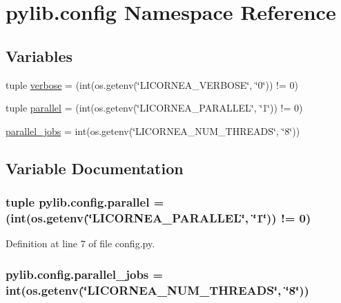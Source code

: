 \hypertarget{namespacepylib_1_1config}{}\section{pylib.\+config Namespace Reference}
\label{namespacepylib_1_1config}
\subsection*{Variables}
\begin{DoxyCompactItemize}
\item 
tuple \hyperlink{namespacepylib_1_1config_a438cd472f53260ba54c02463f1d387ea}{verbose} = (int(os.\+getenv(\char`\"{}L\+I\+C\+O\+R\+N\+E\+A\+\_\+\+V\+E\+R\+B\+O\+SE\char`\"{}, \char`\"{}0\char`\"{})) != 0)
\item 
tuple \hyperlink{namespacepylib_1_1config_a9f699a65a2b9174996c25d6d38c7baa4}{parallel} = (int(os.\+getenv(\char`\"{}L\+I\+C\+O\+R\+N\+E\+A\+\_\+\+P\+A\+R\+A\+L\+L\+EL\char`\"{}, \char`\"{}1\char`\"{})) != 0)
\item 
\hyperlink{namespacepylib_1_1config_a090a7303c411105af2edd4bccfff1af5}{parallel\+\_\+jobs} = int(os.\+getenv(\char`\"{}L\+I\+C\+O\+R\+N\+E\+A\+\_\+\+N\+U\+M\+\_\+\+T\+H\+R\+E\+A\+DS\char`\"{}, \char`\"{}8\char`\"{}))
\end{DoxyCompactItemize}


\subsection{Variable Documentation}
\subsubsection[{\texorpdfstring{parallel}{parallel}}]{\setlength{\rightskip}{0pt plus 5cm}tuple pylib.\+config.\+parallel = (int(os.\+getenv(\char`\"{}L\+I\+C\+O\+R\+N\+E\+A\+\_\+\+P\+A\+R\+A\+L\+L\+EL\char`\"{}, \char`\"{}1\char`\"{})) != 0)}\hypertarget{namespacepylib_1_1config_a9f699a65a2b9174996c25d6d38c7baa4}{}\label{namespacepylib_1_1config_a9f699a65a2b9174996c25d6d38c7baa4}


Definition at line 7 of file config.\+py.

\subsubsection[{\texorpdfstring{parallel\+\_\+jobs}{parallel_jobs}}]{\setlength{\rightskip}{0pt plus 5cm}pylib.\+config.\+parallel\+\_\+jobs = int(os.\+getenv(\char`\"{}L\+I\+C\+O\+R\+N\+E\+A\+\_\+\+N\+U\+M\+\_\+\+T\+H\+R\+E\+A\+DS\char`\"{}, \char`\"{}8\char`\"{}))}\hypertarget{namespacepylib_1_1config_a090a7303c411105af2edd4bccfff1af5}{}\label{namespacepylib_1_1config_a090a7303c411105af2edd4bccfff1af5}


